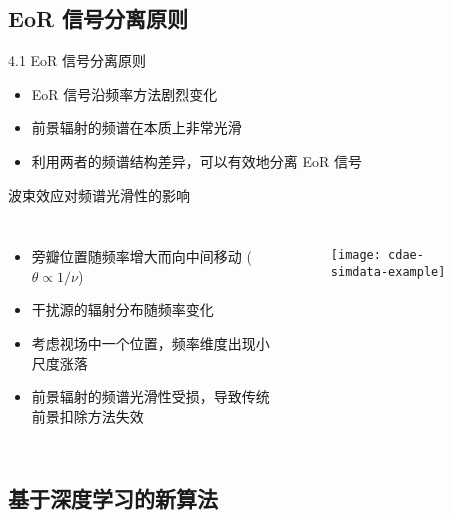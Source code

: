 \documentclass{beamer}
\begin{document}
\subsection{EoR 信号分离原则}

\begin{frame}{4.1 EoR 信号分离原则}
  \begin{itemize}
    \item EoR 信号沿频率方法剧烈变化
    \item 前景辐射的频谱在本质上非常光滑
    \item 利用两者的频谱结构差异，可以有效地分离 EoR 信号
  \end{itemize}
\end{frame}

\begin{frame}[t]
  \begin{alertblock}{波束效应对频谱光滑性的影响}
  \end{alertblock}
  \begin{columns}
    \begin{itemize}
      \item 旁瓣位置随频率增大而向中间移动 ($\theta \propto 1/\nu$)
      \item 干扰源的辐射分布随频率变化
      \item 考虑视场中一个位置，频率维度出现小尺度涨落
      \item 前景辐射的频谱光滑性受损，导致传统前景扣除方法失效
    \end{itemize}

    \begin{figure}
      \centering
      \texttt{[image: cdae-simdata-example]}
    \end{figure}
  \end{columns}
\end{frame}

\subsection{基于深度学习的新算法}
\end{document}
